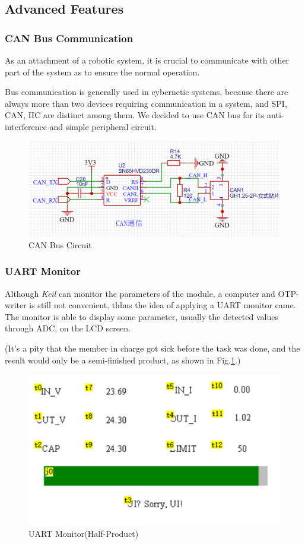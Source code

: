 \documentclass[a4paper,num-refs]{oup-contemporary}
\begin{document}
\subsection{Advanced Features}
\subsubsection{CAN Bus Communication}
As an attachment of a robotic system, it is crucial to communicate with other part of the system as to ensure the normal operation.

Bus communication is generally used in cybernetic systems, because there are always more than two devices requiring communication in a system, and SPI, CAN, IIC are distinct among them. We decided to use CAN bus for its anti-interference and simple peripheral circuit.

\begin{figure}[h]
	\centering
	\includegraphics[width = 0.7\linewidth]{CAN.png}
	\caption{CAN Bus Circuit}
\end{figure}

\subsubsection{UART Monitor}
Although \textit{Keil} can monitor the parameters of the module, a computer and OTP-writer is still not convenient, thhus the idea of applying a UART monitor came. The monitor is able to display some parameter, usually the detected values through ADC, on the LCD screen.

(It's a pity that the member in charge got sick before the task was done, and the result would only be a semi-finished product, as shown in Fig.\ref{UART}.)

\begin{figure}[h]
	\centering
	\includegraphics[width = 0.7\linewidth]{UART.png}
	\caption{UART Monitor(Half-Product)}
	\label{UART}
\end{figure}
\end{document}
